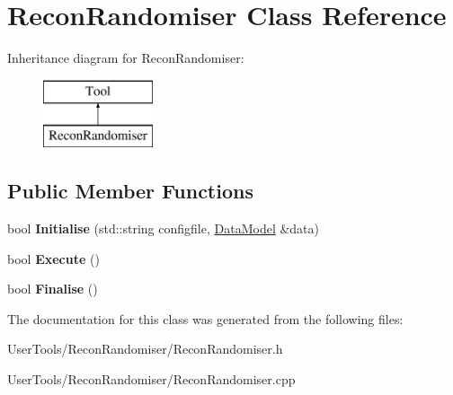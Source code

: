\hypertarget{classReconRandomiser}{\section{Recon\-Randomiser Class Reference}
\label{classReconRandomiser}
}
Inheritance diagram for Recon\-Randomiser\-:\begin{figure}[H]
\begin{center}
\leavevmode
\includegraphics[height=2.000000cm]{classReconRandomiser}
\end{center}
\end{figure}
\subsection*{Public Member Functions}
\begin{DoxyCompactItemize}
\item 
\hypertarget{classReconRandomiser_a5fcdae68a66b1a1988b36cc9224d63e2}{bool {\bfseries Initialise} (std\-::string configfile, \hyperlink{classDataModel}{Data\-Model} \&data)}\label{classReconRandomiser_a5fcdae68a66b1a1988b36cc9224d63e2}

\item 
\hypertarget{classReconRandomiser_a45093e181c6a60ee31efafba3a11e676}{bool {\bfseries Execute} ()}\label{classReconRandomiser_a45093e181c6a60ee31efafba3a11e676}

\item 
\hypertarget{classReconRandomiser_a9376c492952fac4d5ff59f1c57a4cee7}{bool {\bfseries Finalise} ()}\label{classReconRandomiser_a9376c492952fac4d5ff59f1c57a4cee7}

\end{DoxyCompactItemize}


The documentation for this class was generated from the following files\-:\begin{DoxyCompactItemize}
\item 
User\-Tools/\-Recon\-Randomiser/Recon\-Randomiser.\-h\item 
User\-Tools/\-Recon\-Randomiser/Recon\-Randomiser.\-cpp\end{DoxyCompactItemize}
